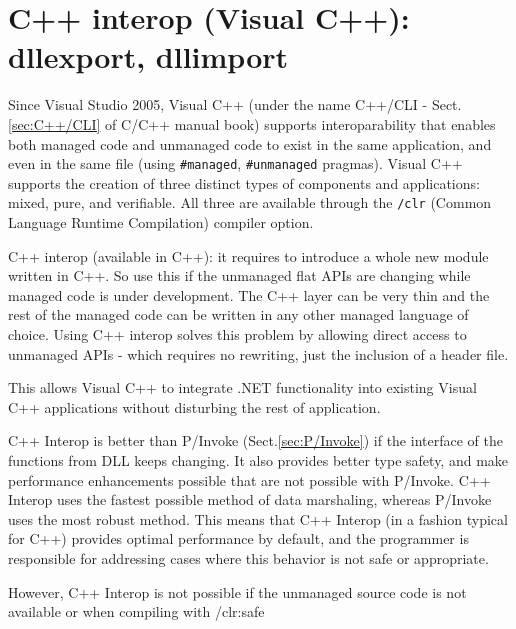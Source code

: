 \section{C++ interop (Visual C++): dllexport, dllimport}
\label{sec:interop_C_Csharp}

Since Visual Studio 2005, Visual C++ (under the name C++/CLI -
Sect.\ref{sec:C++/CLI} of C/C++ manual book) supports interoparability that
enables both managed code and unmanaged code to exist in the same application,
and even in the same file (using \verb!#managed!, \verb!#unmanaged! pragmas).
Visual C++ supports the creation of three distinct types of components and
applications: mixed, pure, and verifiable. All three are available through the
\verb!/clr! (Common Language Runtime Compilation) compiler option.

C++ interop (available in C++): it requires to introduce a whole new
  module written in C++. So use this if the unmanaged flat APIs are changing
  while managed code is under development. The C++ layer can be very thin and
  the rest of the managed code can be written in any other managed language of
  choice. Using C++ interop solves this problem by allowing direct access to
  unmanaged APIs - which requires no rewriting, just the inclusion of a header
  file. 

This allows Visual C++ to integrate .NET functionality into existing Visual C++
applications without disturbing the rest of application. 

C++ Interop is better than P/Invoke (Sect.\ref{sec:P/Invoke}) if the interface
of the functions from DLL keeps changing. It also provides better type safety,
and make performance enhancements possible that are not possible with P/Invoke.
C++ Interop uses the fastest possible method of data marshaling, whereas
P/Invoke uses the most robust method. This means that C++ Interop (in a fashion
typical for C++) provides optimal performance by default, and the programmer is
responsible for addressing cases where this behavior is not safe or appropriate.  
 
However, C++ Interop is not possible if the unmanaged source code is not
available or when compiling with /clr:safe

% 

% 
% 
% 
% 
%   


